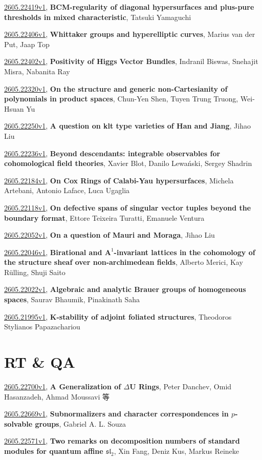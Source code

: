 \documentclass[9pt, a4paper]{article}
\theoremstyle{plain}
\theoremstyle{definition}
\theoremstyle{remark}
\newcommand{\arxiv}[3]{\href{https://arxiv.org/abs/#1}{#1}, \textbf{\textcolor{arxivblue}{#2}}, #3}
\begin{document}
\arxiv{2605.22419v1}{BCM-regularity of diagonal hypersurfaces and plus-pure thresholds in mixed characteristic}{Tatsuki Yamaguchi}

\arxiv{2605.22406v1}{Whittaker groups and hyperelliptic curves}{Marius van der Put, Jaap Top}

\arxiv{2605.22402v1}{Positivity of Higgs Vector Bundles}{Indranil Biswas, Snehajit Misra, Nabanita Ray}

\arxiv{2605.22320v1}{On the structure and generic non-Cartesianity of polynomials in product spaces}{Chun-Yen Shen, Tuyen Trung Truong, Wei-Hsuan Yu}

\arxiv{2605.22250v1}{A question on klt type varieties of Han and Jiang}{Jihao Liu}

\arxiv{2605.22236v1}{Beyond descendants: integrable observables for cohomological field theories}{Xavier Blot, Danilo Lewański, Sergey Shadrin}

\arxiv{2605.22184v1}{On Cox Rings of Calabi-Yau hypersurfaces}{Michela Artebani, Antonio Laface, Luca Ugaglia}

\arxiv{2605.22118v1}{On defective spans of singular vector tuples beyond the boundary format}{Ettore Teixeira Turatti, Emanuele Ventura}

\arxiv{2605.22052v1}{On a question of Mauri and Moraga}{Jihao Liu}

\arxiv{2605.22046v1}{Birational and $\mathbf{A}^1$-invariant lattices in the cohomology of the structure sheaf over non-archimedean fields}{Alberto Merici, Kay Rülling, Shuji Saito}

\arxiv{2605.22022v1}{Algebraic and analytic Brauer groups of homogeneous spaces}{Saurav Bhaumik, Pinakinath Saha}

\arxiv{2605.21995v1}{K-stability of adjoint foliated structures}{Theodoros Stylianos Papazachariou}


\section{RT \& QA}
\arxiv{2605.22700v1}{A Generalization of $Δ$U Rings}{Peter Danchev, Omid Hasanzadeh, Ahmad Moussavi 等}

\arxiv{2605.22669v1}{Subnormalizers and character correspondences in $p$-solvable groups}{Gabriel A. L. Souza}

\arxiv{2605.22571v1}{Two remarks on decomposition numbers of standard modules for quantum affine $\mathfrak{sl}_2$}{Xin Fang, Deniz Kus, Markus Reineke}
\end{document}
